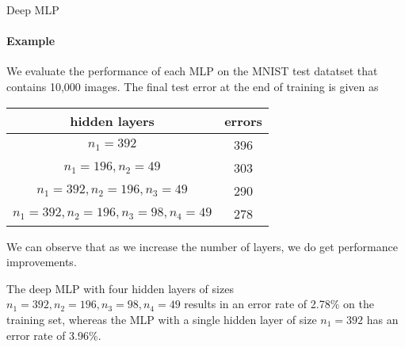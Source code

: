 \begin{frame}{Deep MLP}
\framesubtitle{Example}

We evaluate the 
    performance of each MLP on the MNIST test datatset that contains 10,000
    images.
    The final test error at the end of training
    is given as
    \begin{center}
        \begin{tabular}{|c||c|}
            \hline
            hidden layers & errors\\
            \hline
            $n_1=392$ & 396\\
            $n_1=196,n_2=49$ & 303\\
            $n_1=392,n_2=196,n_3=49$ & 290\\
            $n_1=392,n_2=196,n_3=98,n_4=49$ & 278\\
            \hline
        \end{tabular}
    \end{center}
    We can observe that as we increase the number of layers, we do get
    performance improvements. 

	\medskip

	The deep MLP with four hidden layers of
    sizes $n_1=392,n_2=196,n_3=98,n_4=49$ results in an error rate of
    2.78\% on the training set, whereas the MLP with a single hidden
    layer of size $n_1=392$ has an error rate of 3.96\%.

\end{frame}
